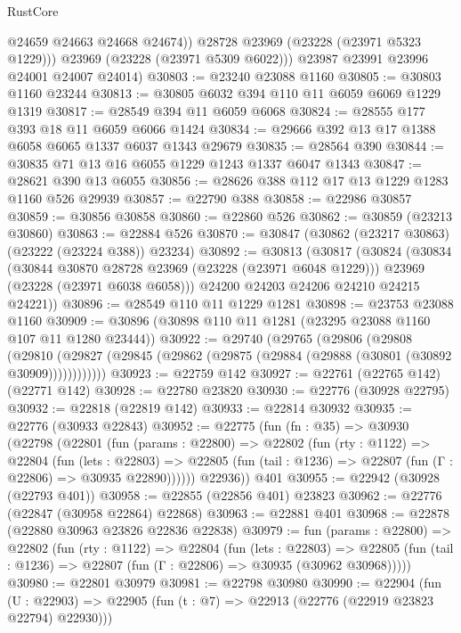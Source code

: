 \begin{lexlean}{RustCore}
\begin{coremodule}
              @24659
              @24663
              @24668
              @24674))
          @28728
          @23969
          (@23228 (@23971 @5323 @1229)))
        @23969
        (@23228 (@23971 @5309 @6022)))
      @23987
      @23991
      @23996
      @24001
      @24007
      @24014)
@30803 := @23240 @23088 @1160
@30805 := @30803 @1160 @23244
@30813 := @30805 @6032 @394 @110 @11 @6059 @6069 @1229 @1319
@30817 := @28549 @394 @11 @6059 @6068
@30824 := @28555 @177 @393 @18 @11 @6059 @6066 @1424
@30834 := @29666 @392 @13 @17 @1388 @6058 @6065 @1337 @6037 @1343 @29679
@30835 := @28564 @390
@30844 := @30835 @71 @13 @16 @6055 @1229 @1243 @1337 @6047 @1343
@30847 := @28621 @390 @13 @6055
@30856 := @28626 @388 @112 @17 @13 @1229 @1283 @1160 @526 @29939
@30857 := @22790 @388
@30858 := @22986 @30857
@30859 := @30856 @30858
@30860 := @22860 @526
@30862 := @30859 (@23213 @30860)
@30863 := @22884 @526
@30870 := @30847 (@30862 (@23217 @30863) (@23222 (@23224 @388)) @23234)
@30892 := @30813
    (@30817
      (@30824
        (@30834
          (@30844 @30870 @28728 @23969 (@23228 (@23971 @6048 @1229)))
          @23969
          (@23228 (@23971 @6038 @6058)))
        @24200
        @24203
        @24206
        @24210
        @24215
        @24221))
@30896 := @28549 @110 @11 @1229 @1281
@30898 := @23753 @23088 @1160
@30909 := @30896 (@30898 @110 @11 @1281 (@23295 @23088 @1160 @107 @11 @1280 @23444))
@30922 := @29740
    (@29765
      (@29806
        (@29808
          (@29810 (@29827 (@29845 (@29862 (@29875 (@29884 (@29888 (@30801 (@30892 @30909))))))))))))
@30923 := @22759 @142
@30927 := @22761 (@22765 @142) (@22771 @142)
@30928 := @22780 @23820
@30930 := @22776 (@30928 @22795)
@30932 := @22818 (@22819 @142)
@30933 := @22814 @30932
@30935 := @22776 (@30933 @22843)
@30952 := @22775
    (fun (fn : @35) =>
    @30930
      (@22798
        (@22801
          (fun (params : @22800) =>
          @22802
            (fun (rty : @1122) =>
            @22804
              (fun (lets : @22803) =>
              @22805 (fun (tail : @1236) => @22807 (fun (Γ : @22806) => @30935 @22890))))))
        @22936))
    @401
@30955 := @22942 (@30928 (@22793 @401))
@30958 := @22855 (@22856 @401) @23823
@30962 := @22776 (@22847 (@30958 @22864) @22868)
@30963 := @22881 @401
@30968 := @22878 (@22880 @30963 @23826 @22836 @22838)
@30979 := fun (params : @22800) =>
  @22802
    (fun (rty : @1122) =>
    @22804
      (fun (lets : @22803) =>
      @22805 (fun (tail : @1236) => @22807 (fun (Γ : @22806) => @30935 (@30962 @30968)))))
@30980 := @22801 @30979
@30981 := @22798 @30980
@30990 := @22904
    (fun (U : @22903) => @22905 (fun (t : @7) => @22913 (@22776 (@22919 @23823 @22794) @22930)))

\end{coremodule}
\end{lexlean}
